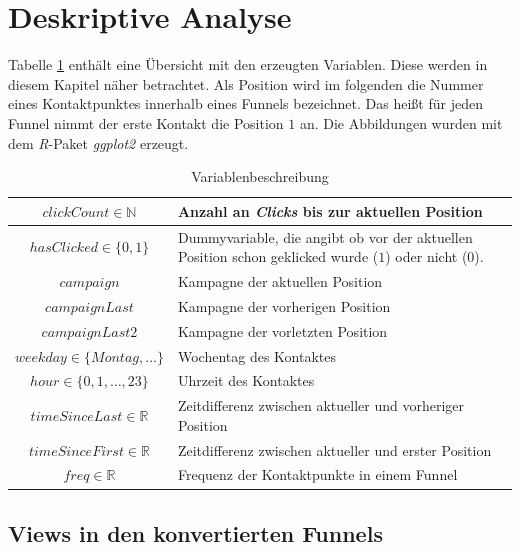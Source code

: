 \section{Deskriptive  Analyse}\label{descriptiv}

Tabelle \ref{varbeschreibung} enthält eine Übersicht mit den erzeugten Variablen. Diese werden in diesem Kapitel näher betrachtet. Als Position wird im folgenden die Nummer eines Kontaktpunktes innerhalb eines Funnels bezeichnet. Das heißt für jeden Funnel nimmt der erste Kontakt die Position $1$ an. Die Abbildungen wurden mit dem \textit{R}-Paket \textit{ggplot2} \cite{ggplot2} erzeugt.
\begin{table}[H]
    \begin{center}
\begin{tabular}{|c|p{10cm}|}
		\hline $ clickCount \in \mathbb{N} $ & Anzahl an \textit{Clicks} bis zur aktuellen Position\\
    \hline $ hasClicked\in\{0,1\} $  & Dummyvariable, die angibt ob vor der aktuellen Position schon geklicked wurde ($1$) oder nicht ($0$). \\
		\hline $ campaign $ & Kampagne der aktuellen Position\\ 
    \hline $ campaignLast $ & Kampagne der vorherigen Position\\ 
    \hline $ campaignLast2 $  & Kampagne der vorletzten Position\\
    \hline $ weekday \in \{Montag,...\}$ & Wochentag des Kontaktes  \\
    \hline $ hour \in \{0,1,\dots, 23\} $  & Uhrzeit des Kontaktes \\
    \hline $ timeSinceLast \in \mathbb{R}$  & Zeitdifferenz zwischen aktueller und vorheriger Position\\
    \hline $ timeSinceFirst \in \mathbb{R} $ & Zeitdifferenz zwischen aktueller und erster Position\\
    \hline$ freq \in \mathbb{R} $ & Frequenz der Kontaktpunkte in einem Funnel\\
    \hline
\end{tabular} 
 \end{center}
 \caption{Variablenbeschreibung}\label{varbeschreibung}
\end{table}

\subsection{Views in den konvertierten Funnels}\label{plotsViews}

